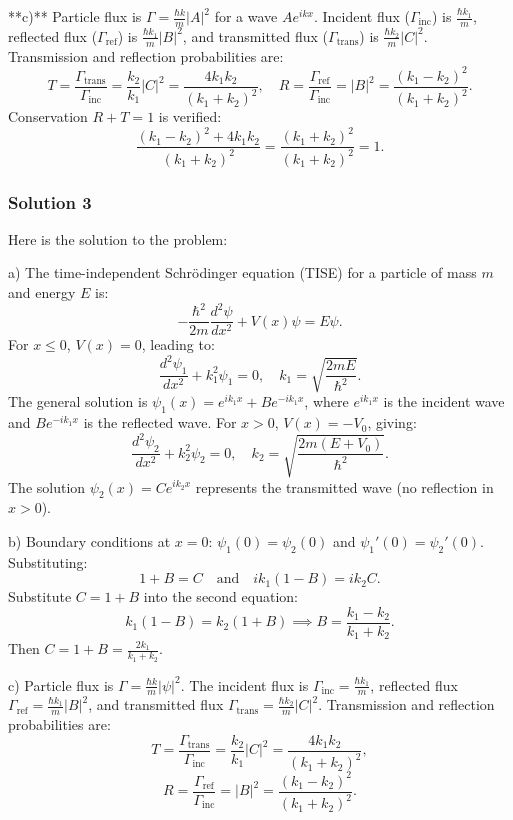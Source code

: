 \documentclass{article}
\begin{document}
**c)** Particle flux is \(\Gamma = \frac{\hbar k}{m}|A|^2\) for a wave \(Ae^{ikx}\). Incident flux (\(\Gamma_{\text{inc}}\)) is \(\frac{\hbar k_1}{m}\), reflected flux (\(\Gamma_{\text{ref}}\)) is \(\frac{\hbar k_1}{m}|B|^2\), and transmitted flux (\(\Gamma_{\text{trans}}\)) is \(\frac{\hbar k_2}{m}|C|^2\). Transmission and reflection probabilities are:
\[
T = \frac{\Gamma_{\text{trans}}}{\Gamma_{\text{inc}}} = \frac{k_2}{k_1}|C|^2 = \frac{4k_1k_2}{(k_1 + k_2)^2}, \quad R = \frac{\Gamma_{\text{ref}}}{\Gamma_{\text{inc}}} = |B|^2 = \frac{(k_1 - k_2)^2}{(k_1 + k_2)^2}.
\]
Conservation \(R + T = 1\) is verified:
\[
\frac{(k_1 - k_2)^2 + 4k_1k_2}{(k_1 + k_2)^2} = \frac{(k_1 + k_2)^2}{(k_1 + k_2)^2} = 1.
\]

\subsubsection{Solution 3}
Here is the solution to the problem:

a) The time-independent Schrödinger equation (TISE) for a particle of mass \( m \) and energy \( E \) is:
\[
-\frac{\hbar^2}{2m} \frac{d^2\psi}{dx^2} + V(x)\psi = E\psi.
\]
For \( x \leq 0 \), \( V(x) = 0 \), leading to:
\[
\frac{d^2\psi_1}{dx^2} + k_1^2 \psi_1 = 0, \quad k_1 = \sqrt{\frac{2mE}{\hbar^2}}.
\]
The general solution is \( \psi_1(x) = e^{ik_1x} + Be^{-ik_1x} \), where \( e^{ik_1x} \) is the incident wave and \( Be^{-ik_1x} \) is the reflected wave. For \( x > 0 \), \( V(x) = -V_0 \), giving:
\[
\frac{d^2\psi_2}{dx^2} + k_2^2 \psi_2 = 0, \quad k_2 = \sqrt{\frac{2m(E + V_0)}{\hbar^2}}.
\]
The solution \( \psi_2(x) = Ce^{ik_2x} \) represents the transmitted wave (no reflection in \( x > 0 \)).

b) Boundary conditions at \( x = 0 \): \( \psi_1(0) = \psi_2(0) \) and \( \psi_1'(0) = \psi_2'(0) \). Substituting:
\[
1 + B = C \quad \text{and} \quad ik_1(1 - B) = ik_2C.
\]
Substitute \( C = 1 + B \) into the second equation:
\[
k_1(1 - B) = k_2(1 + B) \implies B = \frac{k_1 - k_2}{k_1 + k_2}.
\]
Then \( C = 1 + B = \frac{2k_1}{k_1 + k_2} \).

c) Particle flux is \( \Gamma = \frac{\hbar k}{m} |\psi|^2 \). The incident flux is \( \Gamma_{\text{inc}} = \frac{\hbar k_1}{m} \), reflected flux \( \Gamma_{\text{ref}} = \frac{\hbar k_1}{m} |B|^2 \), and transmitted flux \( \Gamma_{\text{trans}} = \frac{\hbar k_2}{m} |C|^2 \). Transmission and reflection probabilities are:
\[
T = \frac{\Gamma_{\text{trans}}}{\Gamma_{\text{inc}}} = \frac{k_2}{k_1} |C|^2 = \frac{4k_1k_2}{(k_1 + k_2)^2},
\]
\[
R = \frac{\Gamma_{\text{ref}}}{\Gamma_{\text{inc}}} = |B|^2 = \frac{(k_1 - k_2)^2}{(k_1 + k_2)^2}.
\]
\end{document}
